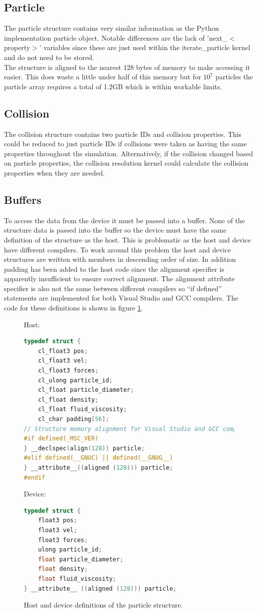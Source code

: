 \documentclass[10pt,a4paper,titlepage]{report}
\begin{document}
\subsection{Particle}
The particle structure contains very similar information as the Python implementation particle object. Notable differences are the lack of 'next\_$<$property$>$' variables since these are just used within the iterate\_particle kernel and do not need to be stored.
\\The structure is aligned to the nearest 128 bytes of memory to make accessing it easier. This does waste a little under half of this memory but for $10^7$ particles the particle array requires a total of 1.2GB which is within workable limits.
\subsection{Collision}
The collision structure contains two particle IDs and collision properties. This could be reduced to just particle IDs if collisions were taken as having the same properties throughout the simulation. Alternatively, if the collision changed based on particle properties, the collision resolution kernel could calculate the collision properties when they are needed.
\subsection{Buffers}
To access the data from the device it must be passed into a buffer. None of the structure data is passed into the buffer so the device must have the same definition of the structure as the host. This is problematic as the host and device have different compilers. To work around this problem the host and device structures are written with members in descending order of size. In addition padding has been added to the host code %
 since the alignment specifier is apparently insufficient to ensure correct alignment. The alignment attribute specifier is also not the same between different compilers so ``if defined'' statements are implemented for both Visual Studio and GCC compilers. The code for these definitions is shown in figure \ref{fig:struct_definitions}.
\begin{figure}[!ht]
Host:
\begin{lstlisting}[language=C]
typedef struct {
    cl_float3 pos;
    cl_float3 vel;
    cl_float3 forces;
    cl_ulong particle_id;
    cl_float particle_diameter;
    cl_float density;
    cl_float fluid_viscosity;
    cl_char padding[56];
// Structure memory alignment for Visual Studio and GCC compilers.
#if defined(_MSC_VER)
} __declspec(align(128)) particle;
#elif defined(__GNUC) || defined(__GNUG__)
} __attribute__((aligned (128))) particle;
#endif
\end{lstlisting}
Device:
\begin{lstlisting}[language=C]
typedef struct {
    float3 pos;
    float3 vel;
    float3 forces;
    ulong particle_id;
    float particle_diameter;
    float density;
    float fluid_viscosity;
} __attribute__ ((aligned (128))) particle;
\end{lstlisting}
\caption{Host and device definitions of the particle structure.}
\label{fig:struct_definitions}
\end{figure}
\end{document}
